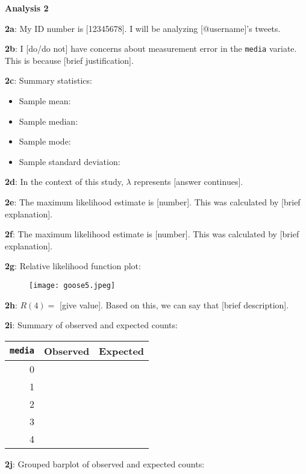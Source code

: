 \documentclass[a4paper,12pt]{article}
\begin{document}
\newpage

\textbf{Analysis 2}\bigskip

\textbf{2a}: My ID number is [12345678]. I will be analyzing [@username]'s tweets.\bigskip

\textbf{2b}: I [do/do not] have concerns about measurement error in the \texttt{media} variate. This is because [brief justification].\bigskip

\textbf{2c}: Summary statistics:

\begin{itemize}
\item Sample mean: 
\item Sample median: 
\item Sample mode: 
\item Sample standard deviation: 
\end{itemize}

\textbf{2d}: In the context of this study, $\lambda$ represents [answer continues].\bigskip

\textbf{2e}: The maximum likelihood estimate is [number]. This was calculated by [brief explanation].\bigskip

\textbf{2f}: The maximum likelihood estimate is [number]. This was calculated by [brief explanation].\bigskip

\textbf{2g}: Relative likelihood function plot:

\begin{figure}[H]
     \centering
     \texttt{[image: goose5.jpeg]}
\end{figure}

\textbf{2h}: $R(4) =$ [give value]. Based on this, we can say that [brief description].\bigskip


\newpage

\textbf{2i}: Summary of observed and expected counts:

\begin{center}
\begin{tabular}{| r | r | r |}\hline
\texttt{media} & Observed & Expected \\\hline
0 &  & \\
1 &  & \\
2 &  & \\
3 &  & \\
4 &   &  \\\hline
\end{tabular}
\end{center}

\textbf{2j}: Grouped barplot of observed and expected counts:
\end{document}
